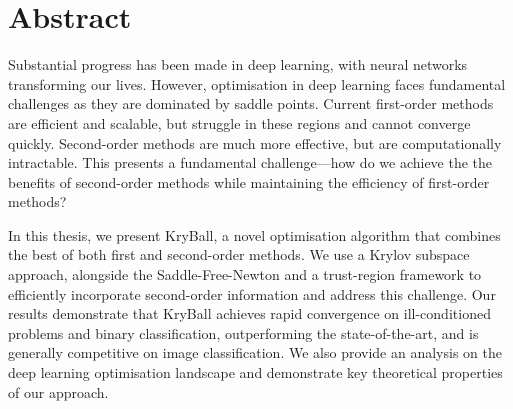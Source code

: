 \chapter*{Abstract}

Substantial progress has been made in deep learning, with neural networks transforming our lives. However, optimisation in deep learning faces fundamental challenges as they are dominated by saddle points. Current first-order methods are efficient and scalable, but struggle in these regions and cannot converge quickly. Second-order methods are much more effective, but are computationally intractable. This presents a fundamental challenge---how do we achieve the 
the benefits of second-order methods while maintaining the efficiency of first-order methods?

In this thesis, we present KryBall, a novel optimisation algorithm that combines the best of both first and second-order methods. We use a Krylov subspace approach, alongside the Saddle-Free-Newton and a trust-region framework to efficiently incorporate second-order information and address this challenge. Our results demonstrate that KryBall achieves rapid convergence on ill-conditioned problems and binary classification, outperforming the state-of-the-art, and is generally competitive on image classification. We also provide an analysis on the deep learning optimisation landscape and demonstrate key theoretical properties of our approach.